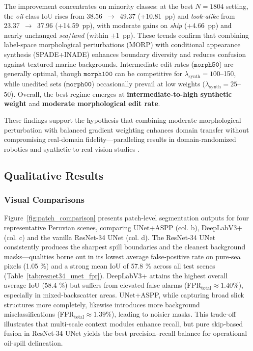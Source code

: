 \documentclass[12pt]{article}
\begin{document}
The improvement concentrates on minority classes: at the best $N{=}1804$ setting, 
the \textit{oil} class IoU rises from 38.56~$\rightarrow$~49.37 (+10.81~pp) 
and \textit{look-alike} from 23.37~$\rightarrow$~37.96 (+14.59~pp), 
with moderate gains on \textit{ship} (+4.66~pp) and nearly unchanged \textit{sea}/\textit{land} (within $\pm$1~pp). 
These trends confirm that combining label-space morphological perturbations (MORP) 
with conditional appearance synthesis (SPADE+INADE) enhances boundary diversity 
and reduces confusion against textured marine backgrounds. 
Intermediate edit rates ($\texttt{morph50}$) are generally optimal, though $\texttt{morph100}$ can be competitive 
for $\lambda_{\text{synth}}{=}100$--150, while unedited sets ($\texttt{morph00}$) occasionally prevail at 
low weights ($\lambda_{\text{synth}}{=}25$--50). 
Overall, the best regime emerges at \textbf{intermediate-to-high synthetic weight} 
and \textbf{moderate morphological edit rate}.

These findings support the hypothesis that combining moderate morphological perturbation with balanced gradient weighting enhances domain transfer without compromising real-domain fidelity—paralleling results in domain-randomized robotics and synthetic-to-real vision studies \citep{tobin_domain_randomization_2017,ros_synthia_2016karpathy_2019_imagenet}.



\subsection{Qualitative Results}

\subsubsection{Visual Comparisons}
Figure~\ref{fig:patch_comparison} presents patch‐level segmentation outputs for four representative Peruvian scenes, comparing UNet+ASPP (col. b), DeepLabV3+ (col. c) and the vanilla ResNet-34 UNet (col. d). The ResNet-34 UNet consistently produces the sharpest spill boundaries and the cleanest background masks—qualities borne out in its lowest average false‐positive rate on pure‐sea pixels (1.05 \%) and a strong mean IoU of 57.8 \% across all test scenes (Table~\ref{tab:resnet34_unet_fpr}). DeepLabV3+ attains the highest overall average IoU (58.4 \%) but suffers from elevated false alarms (FPR\(_\mathrm{total}\approx1.40\%\)), especially in mixed‐backscatter areas. UNet+ASPP, while capturing broad slick structures more completely, likewise introduces more background misclassifications (FPR\(_\mathrm{total}\approx1.39\%\)), leading to noisier masks. This trade‐off illustrates that multi‐scale context modules enhance recall, but pure skip‐based fusion in ResNet-34 UNet yields the best precision–recall balance for operational oil‐spill delineation.
\end{document}

